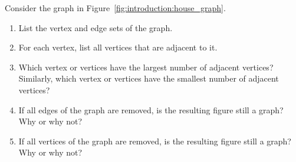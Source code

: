 \begin{example}
\label{eg:introduction:house_graph}
Consider the graph in Figure~\ref{fig:introduction:house_graph}.
\begin{enumerate}
\item List the vertex and edge sets of the graph.

\item For each vertex, list all vertices that are adjacent to it.

\item Which vertex or vertices have the largest number of adjacent
  vertices? Similarly, which vertex or vertices have the smallest
  number of adjacent vertices?

\item If all edges of the graph are removed, is the resulting figure
  still a graph? Why or why not?

\item If all vertices of the graph are removed, is the resulting
  figure still a graph? Why or why not?
\end{enumerate}
\end{example}

